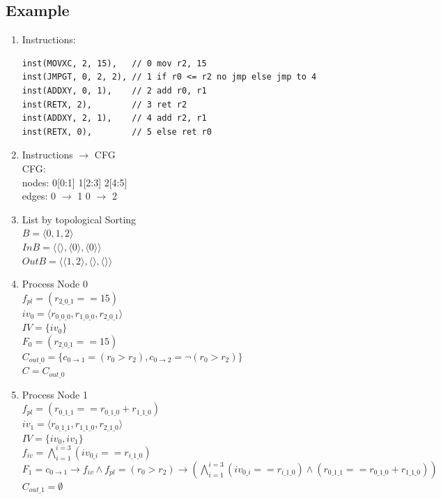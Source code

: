 \documentclass{article}
\begin{document}
\subsection{Example}
\begin{enumerate}
\item Instructions:
\begin{lstlisting}
inst(MOVXC, 2, 15),   // 0 mov r2, 15
inst(JMPGT, 0, 2, 2), // 1 if r0 <= r2 no jmp else jmp to 4
inst(ADDXY, 0, 1),    // 2 add r0, r1
inst(RETX, 2),        // 3 ret r2
inst(ADDXY, 2, 1),    // 4 add r2, r1
inst(RETX, 0),        // 5 else ret r0
\end{lstlisting}
\item Instructions $\rightarrow$ CFG \\
CFG:\\
nodes: 0[0:1] 1[2:3] 2[4:5] \\
edges: 0 $\rightarrow$ 1 0 $\rightarrow$ 2
\item List by topological Sorting \\
$B = \langle 0, 1, 2 \rangle$ \\
$InB = \langle \langle\rangle, \langle 0 \rangle, \langle 0 \rangle \rangle$ \\
$OutB = \langle \langle 1, 2 \rangle, \langle\rangle, \langle  \rangle \rangle$
\item Process Node 0 \\
$f_{pl} = (r_{2\_0\_1} == 15)$\\
$iv_0 = \langle r_{0\_0\_0},r_{1\_0\_0},r_{2\_0\_1}\rangle$ \\
$IV = \{iv_0\}$\\
$F_0 = (r_{2\_0\_1} == 15)$ \\
$C_{out\_0} = \{ c_{0\rightarrow 1}=(r_0 > r_2), c_{0\rightarrow 2}=\neg(r_0 > r_2)\}$ \\
$C = C_{out\_0}$
\item Process Node 1 \\
$f_{pl} = (r_{0\_1\_1} == r_{0\_1\_0} + r_{1\_1\_0})$\\
$iv_1 = \langle r_{0\_1\_1},r_{1\_1\_0},r_{2\_1\_0}\rangle$\\
$IV = \{iv_0, iv_1\}$\\
$f_{iv} = \bigwedge_{i=1}^{i=3} (iv_{0\_i} == r_{i\_1\_0})$\\
$F_1 = c_{0\rightarrow 1} \rightarrow f_{iv} \wedge f_{pl} = (r_0 > r_2)\rightarrow (\bigwedge_{i=1}^{i=3} (iv_{0\_i} == r_{i\_1\_0}) \wedge (r_{0\_1\_1} == r_{0\_1\_0} + r_{1\_1\_0}))$ \\
$C_{out\_1} = \emptyset$ \\

\end{enumerate}
\end{document}
